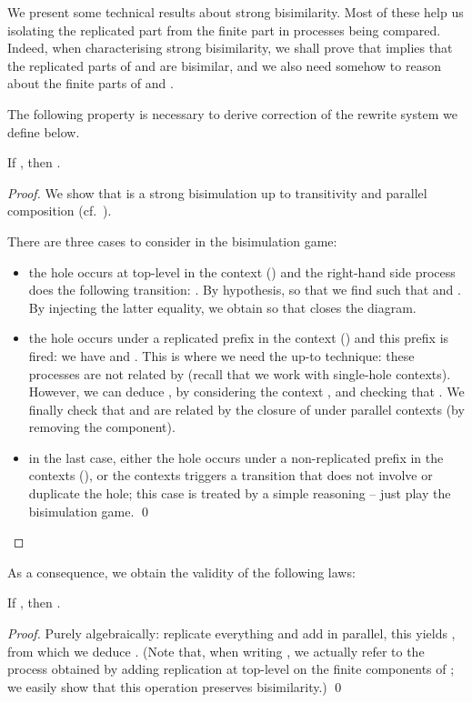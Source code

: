 \documentclass{llncs}
\begin{document}
We present some technical results about strong bisimilarity. Most of
these help us isolating the replicated part from the finite part in
processes being compared. Indeed, when characterising strong
bisimilarity, we shall prove that  implies that the
replicated parts of  and  are bisimilar, and we also need
somehow to reason about the finite parts of  and .

The following property is necessary to derive correction of the
rewrite system we define below.
\begin{prop}\label{prop:simplelaw}
  If , then .
\end{prop}
\begin{proof}
  We show that  is a
  strong bisimulation up to transitivity and parallel composition
  (cf.~\cite{SW01,phd:pous}).

  There are three cases to consider in the bisimulation game:
  \begin{itemize}
  \item the hole occurs at top-level in the context () and the
    right-hand side process does the following transition:
    . By hypothesis,  so
    that we find  such that  and . By injecting the latter equality, we obtain
     so that  closes the diagram.
  \item the hole occurs under a replicated prefix in the context
    () and this prefix is fired: we have
     and . This is where we need the up-to
    technique: these processes are not related by  (recall that we
    work with single-hole contexts). However, we can deduce , by considering the context
    , and checking that
    . We finally check that 
    and  are related by the closure of  under parallel
    contexts (by removing the  component).
  \item in the last case, either the hole occurs under a
    non-replicated prefix in the contexts (), or the
    contexts triggers a transition that does not involve or duplicate
    the hole; this case is treated by a simple reasoning -- just play
    the bisimulation game.  \qed
  \end{itemize}
\end{proof}

As a consequence, we obtain the validity of the following laws:

\begin{lem}\label{lem:cancel:finite:part}
  If , then .
\end{lem}
\begin{proof}
  Purely algebraically: replicate everything and add  in
  parallel, this yields ,
  from which we deduce .
(Note that, when writing , we actually refer to the process
  obtained by adding replication at top-level on the finite components
  of ; we easily show that this operation preserves bisimilarity.)
\qed
\end{proof}
\end{document}
